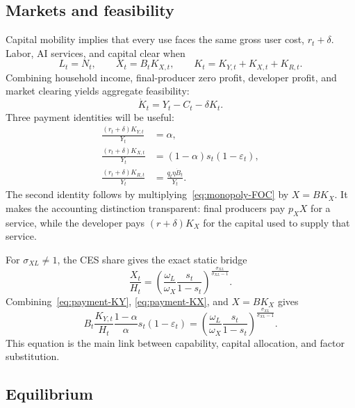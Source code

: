 \subsection{Markets and feasibility}

Capital mobility implies that every use faces the same gross user cost,
$r_t+\delta$.
Labor, AI services, and capital clear when
\begin{equation}
 L_t=N_t,\qquad X_t=B_tK_{X,t},\qquad
 K_t=K_{Y,t}+K_{X,t}+K_{R,t}.
 \label{eq:market-clearing}
\end{equation}
Combining household income, final-producer zero profit, developer profit, and market clearing yields aggregate feasibility:
\begin{equation}
 \dot K_t=Y_t-C_t-\delta K_t.
 \label{eq:resource-constraint}
\end{equation}
Three payment identities will be useful:
\begin{align}
 \frac{(r_t+\delta)K_{Y,t}}{Y_t}&=\alpha,
 \label{eq:payment-KY}\\
 \frac{(r_t+\delta)K_{X,t}}{Y_t}
 &=(1-\alpha)s_t(1-\varepsilon_t),
 \label{eq:payment-KX}\\
 \frac{(r_t+\delta)K_{R,t}}{Y_t}
 &=\frac{q_t\eta\dot B_t}{Y_t}.
 \label{eq:payment-KR}
\end{align}
The second identity follows by multiplying~\eqref{eq:monopoly-FOC} by $X=BK_X$. It makes the accounting distinction transparent: final producers pay $p_XX$ for a service, while the developer pays $(r+\delta)K_X$ for the capital used to supply that service.

For $\sigma_{XL}\neq1$, the CES share gives the exact static bridge
\begin{equation}
 \frac{X_t}{H_t}
 =\left(\frac{\omega_L}{\omega_X}
 \frac{s_t}{1-s_t}\right)^{\frac{\sigma_{XL}}{\sigma_{XL}-1}}.
 \label{eq:CES-bridge}
\end{equation}
Combining~\eqref{eq:payment-KY}, \eqref{eq:payment-KX}, and $X=BK_X$ gives
\begin{equation}
 B_t\frac{K_{Y,t}}{H_t}
 \frac{1-\alpha}{\alpha}s_t(1-\varepsilon_t)
 =\left(\frac{\omega_L}{\omega_X}
 \frac{s_t}{1-s_t}\right)^{\frac{\sigma_{XL}}{\sigma_{XL}-1}}.
 \label{eq:static-master}
\end{equation}
This equation is the main link between capability, capital allocation, and factor substitution.

\subsection{Equilibrium}

